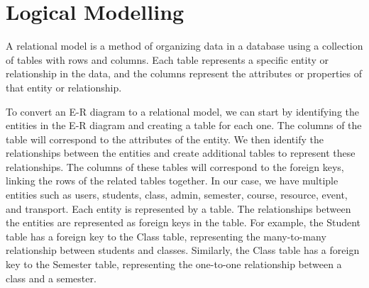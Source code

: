 \section{Logical Modelling}\label{sec:lm}

A relational model is a method of organizing data in a database using a collection of tables with rows and columns. Each table represents a specific entity or relationship in the data, and the columns represent the attributes or properties of that entity or relationship.

To convert an E-R diagram to a relational model, we can start by identifying the entities in the E-R diagram and creating a table for each one. The columns of the table will correspond to the attributes of the entity. We then identify the relationships between the entities and create additional tables to represent these relationships. The columns of these tables will correspond to the foreign keys, linking the rows of the related tables together. In our case, we have multiple entities such as users, students, class, admin, semester, course, resource, event, and transport. Each entity is represented by a table. The relationships between the entities are represented as foreign keys in the table. For example, the Student table has a foreign key to the Class table, representing the many-to-many relationship between students and classes. Similarly, the Class table has a foreign key to the Semester table, representing the one-to-one relationship between a class and a semester.

\clearpage